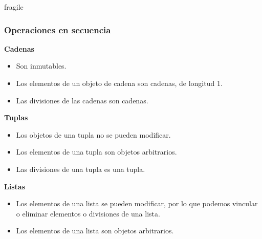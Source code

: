 \documentclass[10pt]{beamer}
\begin{document}
\begin{frame}{fragile}
\frametitle{Operaciones en secuencia}

\vspace{0.2cm}

\textbf{Cadenas}
\vspace{0.2cm}

\begin{itemize}
\item Son inmutables.
\item Los elementos de un objeto de cadena son cadenas, de longitud 1.
\item Las divisiones de las cadenas son cadenas.
\end{itemize}

\vspace{0.2cm}

\textbf{Tuplas}

\begin{itemize}
\item Los objetos de una tupla no se pueden modificar.
\item Los elementos de una tupla son objetos arbitrarios.
\item Las divisiones de una tupla es una tupla.
\end{itemize}


\vspace{0.2cm}

\textbf{Listas}

\begin{itemize}
\item Los elementos de una lista se pueden modificar, por lo que podemos vincular o eliminar elementos o divisiones de una lista.
\item Los elementos de una lista son objetos arbitrarios.
\end{itemize}
\end{frame}
\end{document}

